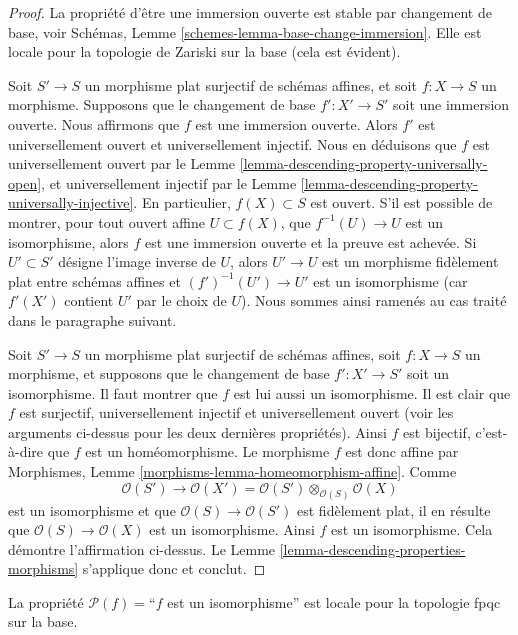 \begin{proof}
La propriété d'être une immersion ouverte est stable par changement de base,
voir Schémas, Lemme \ref{schemes-lemma-base-change-immersion}.
Elle est locale pour la topologie de Zariski sur la base
(cela est évident).

\medskip\noindent
Soit $S' \to S$ un morphisme plat surjectif de schémas affines,
et soit $f : X \to S$ un morphisme. Supposons que le changement de base
$f' : X' \to S'$ soit une immersion ouverte. Nous affirmons que $f$ est une
immersion ouverte.
Alors $f'$ est universellement ouvert et universellement injectif.
Nous en déduisons que $f$ est universellement ouvert par le
Lemme \ref{lemma-descending-property-universally-open}, et
universellement injectif par le
Lemme \ref{lemma-descending-property-universally-injective}.
En particulier, $f(X) \subset S$ est ouvert. S'il est possible de montrer,
pour tout ouvert affine $U \subset f(X)$, que $f^{-1}(U) \to U$
est un isomorphisme, alors $f$ est une immersion ouverte et la preuve est
achevée. Si $U' \subset S'$ désigne l'image inverse de $U$,
alors $U' \to U$ est un morphisme fidèlement plat entre schémas affines et
$(f')^{-1}(U') \to U'$ est un isomorphisme (car $f'(X')$ contient $U'$
par le choix de $U$). Nous sommes ainsi ramenés au cas traité dans le
paragraphe suivant.

\medskip\noindent
Soit $S' \to S$ un morphisme plat surjectif de schémas affines,
soit $f : X \to S$ un morphisme, et supposons que le changement de base
$f' : X' \to S'$ soit un isomorphisme. Il faut montrer que $f$ est lui aussi
un isomorphisme. Il est clair que $f$ est surjectif, universellement injectif
et universellement ouvert (voir les arguments ci-dessus pour les deux
dernières propriétés). Ainsi $f$ est bijectif, c'est-à-dire que $f$ est un
homéomorphisme. Le morphisme $f$ est donc affine par Morphismes,
Lemme \ref{morphisms-lemma-homeomorphism-affine}. Comme
$$
\mathcal{O}(S') \to
\mathcal{O}(X') =
\mathcal{O}(S') \otimes_{\mathcal{O}(S)} \mathcal{O}(X)
$$
est un isomorphisme et que $\mathcal{O}(S) \to \mathcal{O}(S')$
est fidèlement plat, il en résulte que
$\mathcal{O}(S) \to \mathcal{O}(X)$ est un isomorphisme.
Ainsi $f$ est un isomorphisme. Cela démontre l'affirmation ci-dessus.
Le Lemme \ref{lemma-descending-properties-morphisms} s'applique donc et conclut.
\end{proof}

\begin{lemma}
\label{lemma-descending-property-isomorphism}
La propriété $\mathcal{P}(f) =$``$f$ est un isomorphisme''
est locale pour la topologie fpqc sur la base.
\end{lemma}

